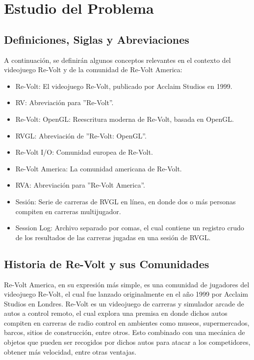 \chapter{Estudio del Problema}

\section{Definiciones, Siglas y Abreviaciones}
A continuación, se definirán algunos conceptos relevantes en el contexto del videojuego Re-Volt y de la comunidad de Re-Volt America:

\begin{itemize}
	\item Re-Volt: El videojuego Re-Volt, publicado por Acclaim Studios en 1999.
	\item RV: Abreviación para ''Re-Volt''.
	\item Re-Volt: OpenGL: Reescritura moderna de Re-Volt, basada en OpenGL.
	\item RVGL: Abreviación de ''Re-Volt: OpenGL''.
	\item Re-Volt I/O: Comunidad europea de Re-Volt.
	\item Re-Volt America: La comunidad americana de Re-Volt.
	\item RVA: Abreviación para ''Re-Volt America''.
	\item Sesión: Serie de carreras de RVGL en línea, en donde dos o más personas compiten en carreras multijugador.
	\item Session Log: Archivo separado por comas, el cual contiene un registro crudo de los resultados de las carreras jugadas en una sesión de RVGL.
\end{itemize}

\section{Historia de Re-Volt y sus Comunidades}
Re-Volt America, en su expresión más simple, es una comunidad de jugadores del videojuego Re-Volt, el cual fue lanzado originalmente en el año 1999 por Acclaim Studios en Londres. Re-Volt es un videojuego de carreras y simulador arcade de autos a control remoto, el cual explora una premisa en donde dichos autos compiten en carreras de radio control en ambientes como museos, supermercados, barcos, sitios de construcción, entre otros. Esto combinado con una mecánica de objetos que pueden ser recogidos por dichos autos para atacar a los competidores, obtener más velocidad, entre otras ventajas.

